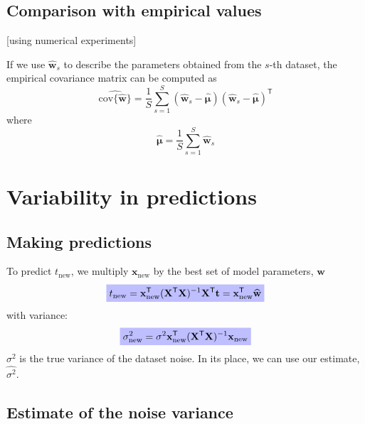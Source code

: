 \subsection{Comparison with empirical values}

[using numerical experiments]

If we use $\widehat{\mathbf{w}}_{s}$ to describe the parameters obtained from the $s$-th
dataset, the empirical covariance matrix can be computed as
\begin{equation*}
\widehat{ \mathrm{cov} \{ \widehat{\mathbf{w}} \} } = \frac{1}{S} \sum_{s=1}^{S}
\left( \widehat{\mathbf{w}}_{s} - \widehat{\boldsymbol{\mu}} \right)
\left( \widehat{\mathbf{w}}_{s} - \widehat{\boldsymbol{\mu}} \right)^{\mathsf{T}}
\end{equation*}
where
\begin{equation*}
\widehat{\boldsymbol{\mu}} = \frac{1}{S} \sum_{s=1}^{S} \widehat{\mathbf{w}}_{s}
\end{equation*}

\section{Variability in predictions}

\subsection{Making predictions}

To predict $t_{\mathrm{new}}$, we multiply $\mathbf{x}_{\mathrm{new}}$
by the best set of model parameters, $\widehat{\mathbf{w}}$
\begin{equation}
\highlighteq{
t_{\mathrm{new}} = \mathbf{x}_{\mathrm{new}}^{\mathsf{T}}
(\mathbf{X}^{\mathsf{T}}\mathbf{X})^{-1}
\mathbf{X}^{\mathsf{T}}\mathbf{t} = 
\mathbf{x}_{\mathrm{new}}^{\mathsf{T}} \widehat{\mathbf{w}}
}
\end{equation}
with variance:
\begin{equation}
\highlighteq{
\sigma^2_{\mathrm{new}} = \sigma^{2} \mathbf{x}^{\mathsf{T}}_{\mathrm{new}}
(\mathbf{X}^{\mathsf{T}}\mathbf{X})^{-1} \mathbf{x}_{\mathrm{new}}
}
\end{equation}
$\sigma^2$ is the true variance of the dataset noise. In its place, we can use our
estimate, $\widehat{\sigma^2}$.

\subsection{Estimate of the noise variance}

